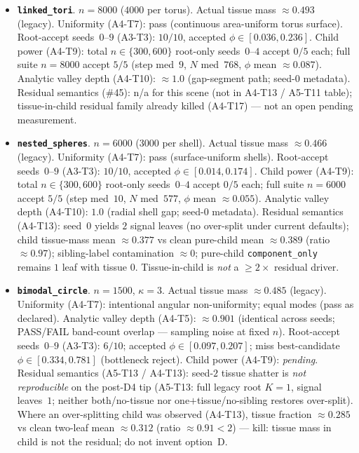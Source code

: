 \documentclass[11pt]{article}
\begin{document}
\begin{itemize}[leftmargin=1.2em]
  \item \textbf{\texttt{linked\_tori}}.
  $n{=}8000$ ($4000$ per torus).
  Actual tissue mass $\approx 0.493$ (legacy).
  Uniformity (A4-T7): pass (continuous area-uniform torus surface).
  Root-accept seeds~$0$--$9$ (A3-T3): $10/10$,
  accepted $\phi\in[0.036,0.236]$.
  Child power (A4-T9): total $n{\in}\{300,600\}$ root-only seeds~$0$--$4$
  accept $0/5$ each; full suite $n{=}8000$ accept $5/5$
  (step med~$9$, $N$ med~$768$, $\phi$ mean $\approx 0.087$).
  Analytic valley depth (A4-T10): $\approx 1.0$ (gap-segment path;
  seed-$0$ metadata).
  Residual semantics (\#45): n/a for this scene (not in A4-T13 /
  A5-T11 table); tissue-in-child residual family already killed
  (A4-T17) --- not an open pending measurement.

  \item \textbf{\texttt{nested\_spheres}}.
  $n{=}6000$ ($3000$ per shell).
  Actual tissue mass $\approx 0.466$ (legacy).
  Uniformity (A4-T7): pass (surface-uniform shells).
  Root-accept seeds~$0$--$9$ (A3-T3): $10/10$,
  accepted $\phi\in[0.014,0.174]$.
  Child power (A4-T9): total $n{\in}\{300,600\}$ root-only seeds~$0$--$4$
  accept $0/5$ each; full suite $n{=}6000$ accept $5/5$
  (step med~$10$, $N$ med~$577$, $\phi$ mean $\approx 0.055$).
  Analytic valley depth (A4-T10): $1.0$ (radial shell gap;
  seed-$0$ metadata).
  Residual semantics (A4-T13): seed~$0$ yields $2$ signal leaves (no
  over-split under current defaults); child tissue-mass mean
  $\approx 0.377$ vs clean pure-child mean $\approx 0.389$
  (ratio $\approx 0.97$); sibling-label contamination $\approx 0$;
  pure-child \texttt{component\_only} remains $1$ leaf with tissue
  $0$. Tissue-in-child is \emph{not} a $\ge 2\times$ residual driver.

  \item \textbf{\texttt{bimodal\_circle}}.
  $n{=}1500$, $\kappa{=}3$.
  Actual tissue mass $\approx 0.485$ (legacy).
  Uniformity (A4-T7): intentional angular non-uniformity; equal modes
  (pass as declared).
  Analytic valley depth (A4-T5): $\approx 0.901$ (identical across seeds;
  PASS/FAIL band-count overlap --- sampling noise at fixed $n$).
  Root-accept seeds~$0$--$9$ (A3-T3): $6/10$;
  accepted $\phi\in[0.097,0.207]$;
  miss best-candidate $\phi\in[0.334,0.781]$ (bottleneck reject).
  Child power (A4-T9): \emph{pending}.
  Residual semantics (A5-T13 / A4-T13): seed-$2$ tissue shatter is
  \emph{not reproducible} on the post-D4 tip (A5-T13: full legacy
  root $K{=}1$, signal leaves~$1$; neither both/no-tissue nor
  one$+$tissue/no-sibling restores over-split). Where an over-splitting
  child was observed (A4-T13), tissue fraction $\approx 0.285$ vs clean
  two-leaf mean $\approx 0.312$ (ratio $\approx 0.91{<}2$) --- kill:
  tissue mass in child is not the residual; do not invent option~D.


\end{itemize}
\end{document}
